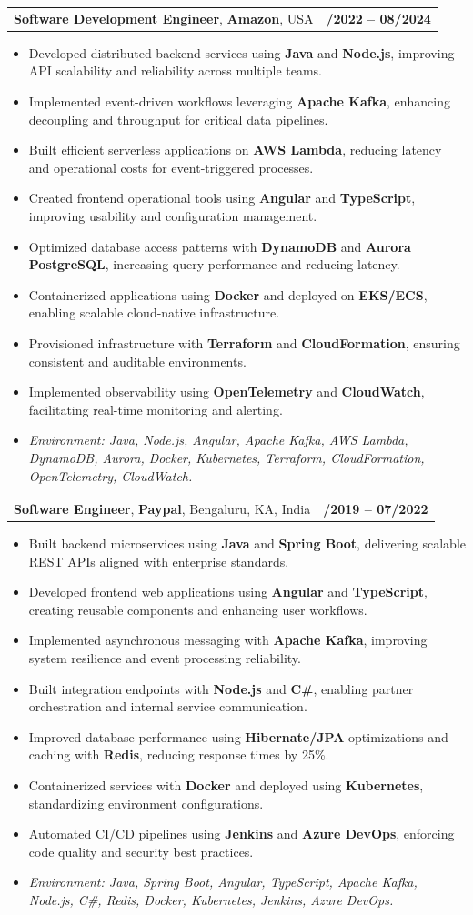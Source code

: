 \documentclass[letterpaper,11pt]{article}
\makeatletter
\newcommand{\resumeItem}[1]{
  \item\footnotesize{
    {#1 \vspace{-2pt}}
  }
}
\newcommand{\resumeSubheading}[4]{
  \vspace{-2pt}\item
    \begin{tabular*}{1.0\textwidth}[t]{l@{\extracolsep{\fill}}r}
      \textbf{\fontsize{10pt}{14pt}\selectfont #3}, \textbf{\fontsize{10pt}{14pt}\selectfont #1}, \fontsize{10pt}{14pt}\selectfont #4 & \textbf{\fontsize{10pt}{14pt}\selectfont #2} \\
    \end{tabular*}\vspace{-7pt}
}
\newcommand{\resumeItemListStart}{\begin{itemize}[leftmargin=*]}
\newcommand{\resumeItemListEnd}{\end{itemize}\vspace{-5pt}}
\makeatother
\begin{document}
\resumeSubheading
{Amazon}{10/2022 -- 08/2024}
{Software Development Engineer}{USA}
\resumeItemListStart
  \resumeItem{Developed distributed backend services using \textbf{Java} and \textbf{Node.js}, improving API scalability and reliability across multiple teams.}
  \resumeItem{Implemented event-driven workflows leveraging \textbf{Apache Kafka}, enhancing decoupling and throughput for critical data pipelines.}
  \resumeItem{Built efficient serverless applications on \textbf{AWS Lambda}, reducing latency and operational costs for event-triggered processes.}
  \resumeItem{Created frontend operational tools using \textbf{Angular} and \textbf{TypeScript}, improving usability and configuration management.}
  \resumeItem{Optimized database access patterns with \textbf{DynamoDB} and \textbf{Aurora PostgreSQL}, increasing query performance and reducing latency.}
  \resumeItem{Containerized applications using \textbf{Docker} and deployed on \textbf{EKS/ECS}, enabling scalable cloud-native infrastructure.}
  \resumeItem{Provisioned infrastructure with \textbf{Terraform} and \textbf{CloudFormation}, ensuring consistent and auditable environments.}
  \resumeItem{Implemented observability using \textbf{OpenTelemetry} and \textbf{CloudWatch}, facilitating real-time monitoring and alerting.}
  \resumeItem{\textit{Environment: Java, Node.js, Angular, Apache Kafka, AWS Lambda, DynamoDB, Aurora, Docker, Kubernetes, Terraform, CloudFormation, OpenTelemetry, CloudWatch.}}
\resumeItemListEnd

\resumeSubheading
{Paypal}{08/2019 -- 07/2022}
{Software Engineer}{Bengaluru, KA, India}
\resumeItemListStart
  \resumeItem{Built backend microservices using \textbf{Java} and \textbf{Spring Boot}, delivering scalable REST APIs aligned with enterprise standards.}
  \resumeItem{Developed frontend web applications using \textbf{Angular} and \textbf{TypeScript}, creating reusable components and enhancing user workflows.}
  \resumeItem{Implemented asynchronous messaging with \textbf{Apache Kafka}, improving system resilience and event processing reliability.}
  \resumeItem{Built integration endpoints with \textbf{Node.js} and \textbf{C\#}, enabling partner orchestration and internal service communication.}
  \resumeItem{Improved database performance using \textbf{Hibernate/JPA} optimizations and caching with \textbf{Redis}, reducing response times by 25\%.}
  \resumeItem{Containerized services with \textbf{Docker} and deployed using \textbf{Kubernetes}, standardizing environment configurations.}
  \resumeItem{Automated CI/CD pipelines using \textbf{Jenkins} and \textbf{Azure DevOps}, enforcing code quality and security best practices.}
  \resumeItem{\textit{Environment: Java, Spring Boot, Angular, TypeScript, Apache Kafka, Node.js, C\#, Redis, Docker, Kubernetes, Jenkins, Azure DevOps.}}
\resumeItemListEnd
\end{document}

